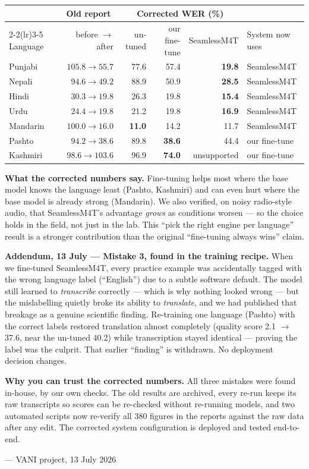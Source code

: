 \documentclass[10pt,a4paper]{article}
\newcommand{\good}[1]{\textcolor{OliveGreen}{#1}}
\newcommand{\bad}[1]{\textcolor{BrickRed}{#1}}
\begin{document}
\begin{center}
\small
\begin{tabular}{@{}l r r r r l@{}}
\toprule
 & \multicolumn{1}{c}{Old report} & \multicolumn{3}{c}{Corrected WER (\%)} & \\
\cmidrule(lr){2-2}\cmidrule(lr){3-5}
Language & before $\rightarrow$ after & un-tuned & our fine-tune & SeamlessM4T & System now uses \\
\midrule
Punjabi  & $105.8 \rightarrow 55.7$ & 77.6 & 57.4 & \textbf{19.8} & SeamlessM4T \\
Nepali   & $94.6 \rightarrow 49.2$  & 88.9 & 50.9 & \textbf{28.5} & SeamlessM4T \\
Hindi    & $30.3 \rightarrow 19.8$  & 26.3 & 19.8 & \textbf{15.4} & SeamlessM4T \\
Urdu     & $24.4 \rightarrow 19.8$  & 21.2 & 19.8 & \textbf{16.9} & SeamlessM4T \\
Mandarin & $100.0 \rightarrow 16.0$ & \textbf{11.0} & \bad{14.2} & 11.7 & SeamlessM4T \\
Pashto   & $94.2 \rightarrow 38.6$  & 89.8 & \textbf{38.6} & 44.4 & \good{our fine-tune} \\
Kashmiri & $98.6 \rightarrow 103.6$ & 96.9 & \textbf{74.0} & unsupported & \good{our fine-tune} \\
\bottomrule
\end{tabular}
\end{center}

\textbf{What the corrected numbers say.} Fine-tuning helps most where the base model knows the language
least (Pashto, Kashmiri) and can even hurt where the base model is already strong (Mandarin). We also
verified, on noisy radio-style audio, that SeamlessM4T's advantage \emph{grows} as conditions worsen ---
so the choice holds in the field, not just in the lab. This ``pick the right engine per language''
result is a stronger contribution than the original ``fine-tuning always wins'' claim.

\textbf{Addendum, 13 July --- Mistake 3, found in the training recipe.} When we fine-tuned SeamlessM4T,
every practice example was accidentally tagged with the wrong language label (``English'') due to a
subtle software default. The model still learned to \emph{transcribe} correctly --- which is why nothing
looked wrong --- but the mislabelling quietly broke its ability to \emph{translate}, and we had
published that breakage as a genuine scientific finding. Re-training one language (Pashto) with the
correct labels restored translation almost completely (quality score 2.1 $\rightarrow$ 37.6, near the
un-tuned 40.2) while transcription stayed identical --- proving the label was the culprit. That earlier
``finding'' is withdrawn. No deployment decision changes.

\textbf{Why you can trust the corrected numbers.} All three mistakes were found in-house, by our own
checks. The old results are archived, every re-run keeps its raw transcripts so scores can be re-checked
without re-running models, and two automated scripts now re-verify all 380 figures in the reports
against the raw data after any edit. The corrected system configuration is deployed and tested end-to-end.

\vspace{2pt}
--- VANI project, 13 July 2026
\end{document}
